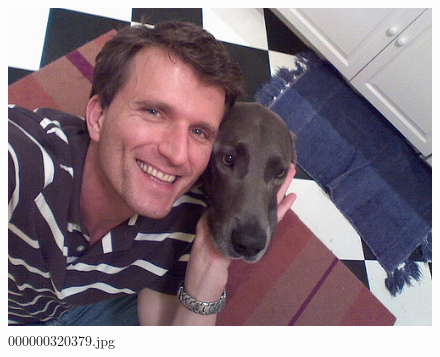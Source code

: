     \begin{figure}[h]
        \centering
        \includegraphics[width=0.8\linewidth]{../image set/easy/000000320379.jpg}
        \caption{000000320379.jpg}
    \end{figure}
